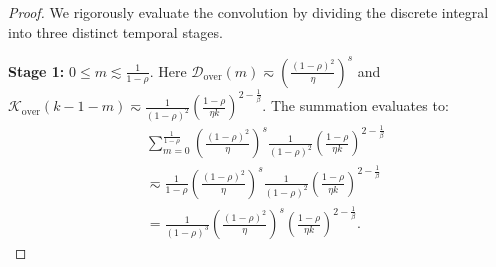 \begin{proof}
We rigorously evaluate the convolution by dividing the discrete integral into three distinct temporal stages.

\textbf{Stage 1:} $0 \le m \lesssim \frac{1}{1-\rho}$. Here $\mathcal{D}_{\mathrm{over}}(m) \eqsim \left(\frac{(1-\rho)^2}{\eta}\right)^s$ and $\mathcal{K}_{\mathrm{over}}(k-1-m) \eqsim \frac{1}{(1-\rho)^2} \left(\frac{1-\rho}{\eta k}\right)^{2-\frac{1}{\beta}}$.
The summation evaluates to:
\begin{align*}
    &\sum_{m=0}^{\frac{1}{1-\rho}} \left(\frac{(1-\rho)^2}{\eta}\right)^s \frac{1}{(1-\rho)^2} \left(\frac{1-\rho}{\eta k}\right)^{2-\frac{1}{\beta}} \\
    &\eqsim \frac{1}{1-\rho} \left(\frac{(1-\rho)^2}{\eta}\right)^s \frac{1}{(1-\rho)^2} \left(\frac{1-\rho}{\eta k}\right)^{2-\frac{1}{\beta}} \\
    &= \frac{1}{(1-\rho)^3} \left(\frac{(1-\rho)^2}{\eta}\right)^s \left(\frac{1-\rho}{\eta k}\right)^{2-\frac{1}{\beta}}.
\end{align*}


\end{proof}
